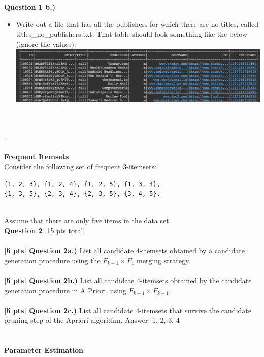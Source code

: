 \documentclass[paper=a4, fontsize=11pt]{scrartcl} %
\begin{document}
\textbf{Question 1 b.)}
\begin{itemize}
    \item Write out a file that has all the publishers for which there are no titles, called titles\_no\_publishers.txt. That table should look something like the below (ignore the values): \\
    \includegraphics[width=150mm]{images/title_no_pub.png}
\end{itemize} \\
\\
.\\
\\
{\huge \textbf{Frequent Itemsets}} \\

Consider the following set of frequent 3-itemsets:

\begin{verbatim}
{1, 2, 3}, {1, 2, 4}, {1, 2, 5}, {1, 3, 4}, 
{1, 3, 5}, {2, 3, 4}, {2, 3, 5}, {3, 4, 5}.
\end{verbatim} \\

Assume that there are only five items in the data set. \\

{\Large \textbf{Question 2} [15 pts total]} \\
\\
\textbf{[5 pts] Question 2a.)} List all candidate 4-itemsets obtained by a candidate generation procedure using the $F_{k - 1} \times F_1$ merging strategy. \\
\\
\textbf{[5 pts] Question 2b.)} List all candidate 4-itemsets obtained by the candidate generation procedure in A Priori, using $F_{k-1} \times F_{k-1}$. \\
\\
\textbf{[5 pts] Question 2c.)} List all candidate 4-itemsets that survive the candidate pruning step of
the Apriori algorithm.
Answer:
{1, 2, 3, 4} \\
\\
\\
{\huge \textbf{Parameter Estimation}} \\
\end{document}
